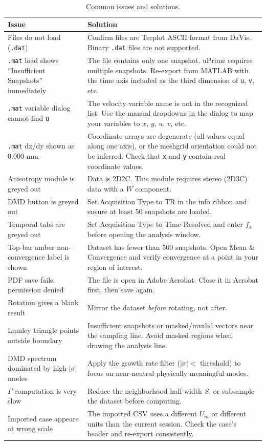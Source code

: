 \documentclass[11pt, a4paper]{report}
\newcommand{\software}[1]{\textsf{#1}}
\begin{document}
\begin{table}[htbp]
\centering
\caption{Common issues and solutions.}
\begin{tabular}{p{5.2cm}p{8.8cm}}
\toprule
\textbf{Issue} & \textbf{Solution} \\
\midrule
Files do not load (\texttt{.dat}) & Confirm files are Tecplot ASCII format from DaVis. Binary \texttt{.dat} files are not supported. \\
\addlinespace
\texttt{.mat} load shows ``Insufficient Snapshots'' immediately & The file contains only one snapshot. \software{uPrime} requires multiple snapshots. Re-export from MATLAB with the time axis included as the third dimension of \texttt{u}, \texttt{v}, etc. \\
\addlinespace
\texttt{.mat} variable dialog cannot find \texttt{u} & The velocity variable name is not in the recognized list. Use the manual dropdowns in the dialog to map your variables to $x$, $y$, $u$, $v$, etc. \\
\addlinespace
\texttt{.mat} dx/dy shown as 0.000 mm & Coordinate arrays are degenerate (all values equal along one axis), or the meshgrid orientation could not be inferred. Check that \texttt{x} and \texttt{y} contain real coordinate values. \\
\addlinespace
Anisotropy module is greyed out & Data is 2D2C. This module requires stereo (2D3C) data with a $W$ component. \\
\addlinespace
DMD button is greyed out & Set Acquisition Type to TR in the info ribbon and ensure at least 50 snapshots are loaded. \\
\addlinespace
Temporal tabs are greyed out & Set Acquisition Type to Time-Resolved and enter $f_s$ before opening the analysis window. \\
\addlinespace
Top-bar amber non-convergence label is shown & Dataset has fewer than 500 snapshots. Open Mean \& Convergence and verify convergence at a point in your region of interest. \\
\addlinespace
PDF save fails: permission denied & The file is open in Adobe Acrobat. Close it in Acrobat first, then save again. \\
\addlinespace
Rotation gives a blank result & Mirror the dataset \emph{before} rotating, not after. \\
\addlinespace
Lumley triangle points outside boundary & Insufficient snapshots or masked/invalid vectors near the sampling line. Avoid masked regions when drawing the analysis line. \\
\addlinespace
DMD spectrum dominated by high-$|\sigma|$ modes & Apply the growth rate filter ($|\sigma| <$ threshold) to focus on near-neutral physically meaningful modes. \\
\addlinespace
$\Gamma$ computation is very slow & Reduce the neighborhood half-width $S$, or subsample the dataset before computing. \\
\addlinespace
Imported case appears at wrong scale & The imported CSV uses a different $U_m$ or different units than the current session. Check the case's header and re-export consistently. \\
\bottomrule
\end{tabular}
\end{table}
\end{document}
